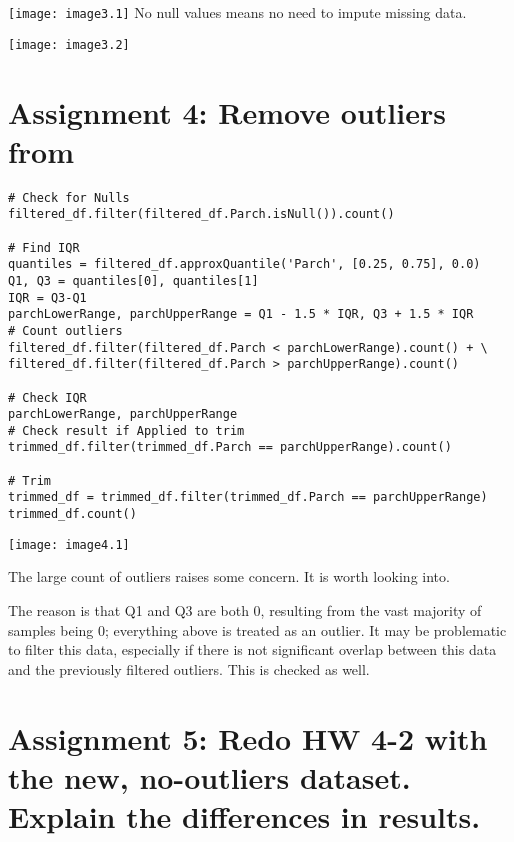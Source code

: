 \documentclass[]{article}
\begin{document}
\texttt{[image: image3.1]}
No null values means no need to impute missing data.

\texttt{[image: image3.2]}


\section*{Assignment 4: Remove outliers from }

\begin{verbatim}
# Check for Nulls
filtered_df.filter(filtered_df.Parch.isNull()).count()

# Find IQR 
quantiles = filtered_df.approxQuantile('Parch', [0.25, 0.75], 0.0)
Q1, Q3 = quantiles[0], quantiles[1]
IQR = Q3-Q1
parchLowerRange, parchUpperRange = Q1 - 1.5 * IQR, Q3 + 1.5 * IQR
# Count outliers
filtered_df.filter(filtered_df.Parch < parchLowerRange).count() + \
filtered_df.filter(filtered_df.Parch > parchUpperRange).count()

# Check IQR
parchLowerRange, parchUpperRange
# Check result if Applied to trim
trimmed_df.filter(trimmed_df.Parch == parchUpperRange).count()

# Trim
trimmed_df = trimmed_df.filter(trimmed_df.Parch == parchUpperRange)
trimmed_df.count()
\end{verbatim}
\texttt{[image: image4.1]}

The large count of outliers raises some concern.
It is worth looking into.

The reason is that Q1 and Q3 are both 0, resulting from the vast majority of samples being 0; everything above is treated as an outlier.
It may be problematic to filter this data, especially if there is not significant overlap between this data and the previously filtered outliers. 
This is checked as well.


\section*{Assignment 5: Redo HW 4-2 with the new, no-outliers dataset. Explain the differences in results.}
\end{document}
